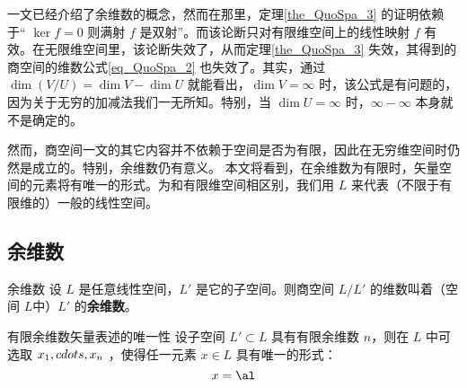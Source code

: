 

一文已经介绍了余维数的概念，然而在那里，定理\autoref{the_QuoSpa_3} 的证明依赖于“ $\ker f=0$ 则满射 $f$ 是双射”。而该论断只对有限维空间上的线性映射 $f$ 有效。在无限维空间里，该论断失效了，从而定理\autoref{the_QuoSpa_3} 失效，其得到的商空间的维数公式\autoref{eq_QuoSpa_2} 也失效了。其实，通过 $\dim(V/U) = \dim V - \dim U$ 就能看出，$\dim V=\infty$ 时，该公式是有问题的，因为关于无穷的加减法我们一无所知。特别，当 $\dim U=\infty$ 时，$\infty-\infty$ 本身就不是确定的。

然而，商空间一文的其它内容并不依赖于空间是否为有限，因此在无穷维空间时仍然是成立的。特别，余维数仍有意义。 本文将看到，在余维数为有限时，矢量空间的元素将有唯一的形式。为和有限维空间相区别，我们用 $L$ 来代表（不限于有限维的）一般的线性空间。

\subsection{余维数}

\begin{definition}{余维数}
设 $L$ 是任意线性空间，$L'$ 是它的子空间。则商空间 $L/L'$ 的维数叫着（空间 $L$中）$L'$ 的\textbf{余维数}。 
\end{definition}


\begin{theorem}{有限余维数矢量表述的唯一性}
设子空间 $L'\subset L$ 具有有限余维数 $n$，则在 $L$ 中可选取 $x_1,\\cdots,x_n$ ，使得任一元素 $x\in L$ 具有唯一的形式：
\begin{equation}
x=\al
\end{equation}

\end{theorem}




